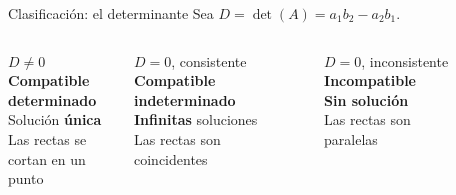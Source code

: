 \documentclass[11pt, aspectratio=169]{beamer}
\begin{document}
	\begin{frame}{Clasificación: el determinante}
		Sea $D = \det(A) = a_1 b_2 - a_2 b_1$.
		
		\vspace{0.8em}
		\begin{columns}[T]
			\begin{exampleblock}{$D \neq 0$}
				\centering\textbf{Compatible\\determinado}\\[4pt]
				Solución \textbf{única}\\[4pt]
				Las rectas se\\cortan en un punto
			\end{exampleblock}
			
			\begin{block}{$D = 0$, consistente}
				\centering\textbf{Compatible\\indeterminado}\\[4pt]
				\textbf{Infinitas} soluciones\\[4pt]
				Las rectas son\\coincidentes
			\end{block}
			
			\begin{alertblock}{$D = 0$, inconsistente}
				\centering\textbf{Incompatible}\\[4pt]
				\textbf{Sin solución}\\[4pt]
				Las rectas son\\paralelas
			\end{alertblock}
		\end{columns}
	\end{frame}
	
\end{document}
